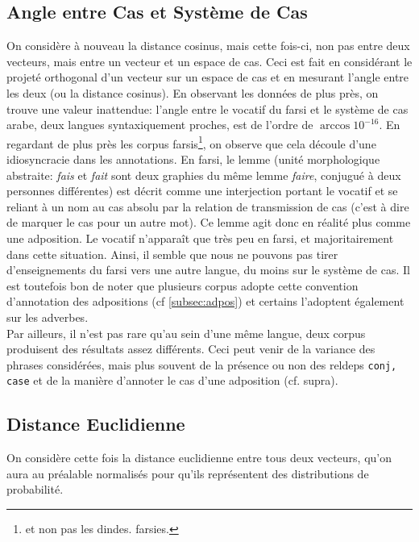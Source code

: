 \documentclass{article}
\begin{document}
\subsection{Angle entre Cas et Système de Cas}\label{subsec:projection}
On considère à nouveau la distance cosinus, mais cette fois-ci, non pas entre deux vecteurs, mais entre un vecteur et un espace de cas.
Ceci est fait en considérant le projeté orthogonal d'un vecteur sur un espace de cas et en mesurant l'angle entre les deux (ou la distance cosinus).
En observant les données de plus près, on trouve une valeur inattendue: l'angle entre le vocatif du farsi et le système de cas arabe, deux langues syntaxiquement proches, est de l'ordre de $\arccos{10^{-16}}$.
En regardant de plus près les corpus farsis\footnote{et non pas les dindes. farsies.}, on observe que cela découle d'une idiosyncracie dans les annotations.
En farsi, le lemme (unité morphologique abstraite: \textsl{fais} et \textsl{fait} sont deux graphies du même lemme \textsl{faire}, conjugué à deux personnes différentes)\label{farsi}
est décrit comme une interjection portant le vocatif et se reliant à un nom au cas absolu par la relation de transmission de cas (c'est à dire de marquer le cas pour un autre mot).
Ce lemme agit donc en réalité plus comme une adposition.
Le vocatif n'apparaît que très peu en farsi, et majoritairement dans cette situation.
Ainsi, il semble que nous ne pouvons pas tirer d'enseignements du farsi vers une autre langue, du moins sur le système de cas.
Il est toutefois bon de noter que plusieurs corpus adopte cette convention d'annotation des adpositions (cf \ref{subsec:adpos}) et certains l'adoptent également sur les adverbes.\\

Par ailleurs, il n'est pas rare qu'au sein d'une même langue, deux corpus produisent des résultats assez différents. Ceci peut venir de la variance des phrases considérées, mais plus souvent de la présence ou non des reldeps \texttt{conj, case} et de la manière d'annoter le cas d'une adposition (cf. supra).

\subsection{Distance Euclidienne}\label{subsec:l2}
On considère cette fois la distance euclidienne entre tous deux vecteurs, qu'on aura au préalable normalisés pour qu'ils représentent des distributions de probabilité.
\end{document}
